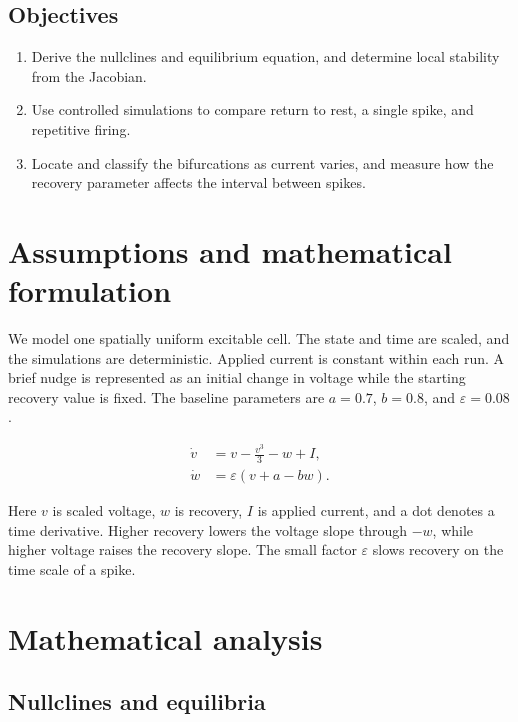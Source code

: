 \documentclass[11pt,a4paper]{article}
\begin{document}
\subsection*{Objectives}

\begin{enumerate}
  \item Derive the nullclines and equilibrium equation, and determine local stability from the Jacobian.
  \item Use controlled simulations to compare return to rest, a single spike, and repetitive firing.
  \item Locate and classify the bifurcations as current varies, and measure how the recovery parameter affects the interval between spikes.
\end{enumerate}

\section{Assumptions and mathematical formulation}

We model one spatially uniform excitable cell. The state and time are scaled, and the simulations are deterministic. Applied current is constant within each run. A brief nudge is represented as an initial change in voltage while the starting recovery value is fixed. The baseline parameters are \(a=0.7\), \(b=0.8\), and \(\varepsilon=0.08\).

\begin{align}
  \dot v &= v-\frac{v^3}{3}-w+I, \label{eq:voltage}\\
  \dot w &= \varepsilon(v+a-bw). \label{eq:recovery}
\end{align}

Here \(v\) is scaled voltage, \(w\) is recovery, \(I\) is applied current, and a dot denotes a time derivative. Higher recovery lowers the voltage slope through \(-w\), while higher voltage raises the recovery slope. The small factor \(\varepsilon\) slows recovery on the time scale of a spike.

\section{Mathematical analysis}

\subsection{Nullclines and equilibria}
\end{document}
